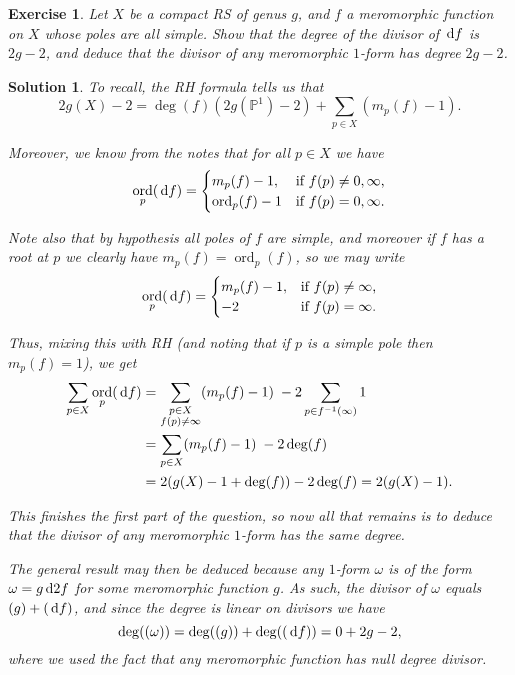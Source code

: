 \documentclass{article}
\newtheorem{ex}{Exercise}
\theoremstyle{nonumberplain}
\newtheorem{sol}{Solution}
\newcommand{\PP}{\mathbb{P}}
\let\div\relax
\DeclareMathOperator{\div}{div}
\DeclareMathOperator{\ord}{ord}
\begin{document}
\begin{ex}
Let $X$ be a compact RS of genus $g$, and $f$ a meromorphic function on $X$ whose poles are all simple. Show that the degree of the divisor of $\dl f$ is $2g-2$, and deduce that the divisor of any meromorphic $1$-form has degree $2g-2$.
\end{ex}

\begin{sol}
To recall, the RH formula tells us that
\begin{equation}\label{eq:rh01}
2 g(X) - 2 = \deg(f) (2 g(\PP^1) - 2) + \sum_{p \in X} (m_p(f) - 1).
\end{equation}

Moreover, we know from the notes that for all $p \in X$ we have
\begin{equation}
\ord_p(\dl f) = \begin{cases}
m_p(f) - 1, & \text{if $f(p) \neq 0, \infty$,}\\
\ord_p(f) - 1 & \text{if $f(p) = 0, \infty$.}
\end{cases}
\end{equation}

Note also that by hypothesis all poles of $f$ are simple, and moreover if $f$ has a root at $p$ we clearly have $m_p(f) = \ord_p(f)$, so we may write
\begin{equation}
\ord_p(\dl f) = \begin{cases}
m_p(f) - 1, & \text{if $f(p) \neq \infty$,}\\
-2 & \text{if $f(p) = \infty$.}
\end{cases}
\end{equation}

Thus, mixing this with RH (and noting that if $p$ is a simple pole then $m_p(f) = 1$), we get
\begin{equation}
\begin{aligned}
\sum_{p \in X} \ord_p(\dl f)
&= \sum_{\substack{p \in X \\ f(p) \neq \infty}} (m_p(f) - 1) \; - 2 \sum_{p \in f^{-1}(\infty)} 1\\
&= \sum_{p \in X} (m_p(f) - 1) \; - 2 \deg(f) \\
&= 2 (g(X) - 1 + \deg(f)) - 2 \deg(f) = 2(g(X) - 1).
\end{aligned}
\end{equation}

This finishes the first part of the question, so now all that remains is to deduce that the divisor of any meromorphic $1$-form has the same degree.

\smallskip

The general result may then be deduced because any $1$-form $\omega$ is of the form $\omega = g \dl2 f$ for some meromorphic function $g$. As such, the divisor of $\omega$ equals $\div(g) + \div(\dl f)$, and since the degree is linear on divisors we have
\begin{equation}
\deg(\div(\omega)) = \deg(\div(g)) + \deg(\div(\dl f)) = 0 + 2g-2,
\end{equation}
where we used the fact that any meromorphic function has null degree divisor.
\end{sol}
\end{document}
